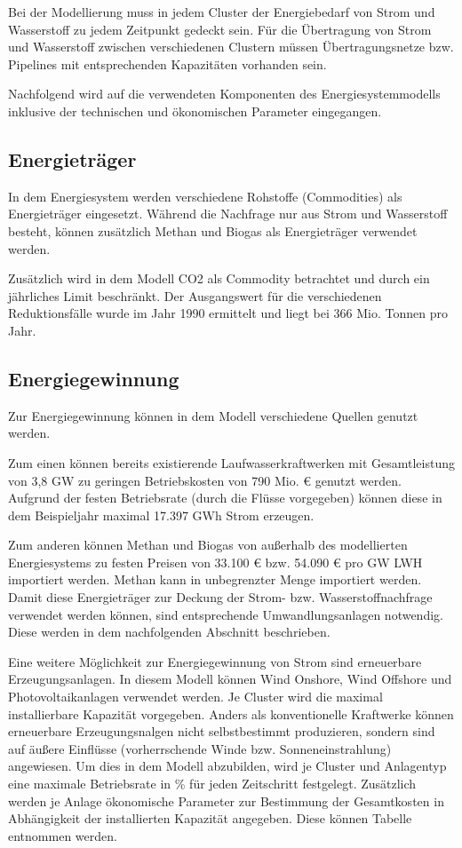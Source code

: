 Bei der Modellierung muss in jedem Cluster der Energiebedarf von Strom und Wasserstoff zu jedem Zeitpunkt gedeckt sein. Für die Übertragung von Strom und Wasserstoff zwischen verschiedenen Clustern müssen Übertragungsnetze bzw. Pipelines mit entsprechenden Kapazitäten vorhanden sein. 

Nachfolgend wird auf die verwendeten Komponenten des Energiesystemmodells inklusive der technischen und ökonomischen Parameter eingegangen. 
 
\subsection{Energieträger}
In dem Energiesystem werden verschiedene Rohstoffe (Commodities) als Energieträger eingesetzt. 
Während die Nachfrage nur aus Strom und Wasserstoff besteht, können zusätzlich Methan und Biogas als Energieträger verwendet werden.

Zusätzlich wird in dem Modell CO2 als Commodity betrachtet und durch ein jährliches Limit beschränkt. Der Ausgangswert für die verschiedenen Reduktionsfälle wurde im Jahr 1990 ermittelt und liegt bei 366 Mio. Tonnen pro Jahr. 

\subsection{Energiegewinnung}
Zur Energiegewinnung können in dem Modell verschiedene Quellen genutzt werden.

Zum einen können bereits existierende Laufwasserkraftwerken mit Gesamtleistung von 3,8 GW zu geringen Betriebskosten von 790 Mio. € genutzt werden. Aufgrund der festen Betriebsrate (durch die Flüsse vorgegeben) können diese in dem Beispieljahr maximal 17.397 GWh Strom erzeugen.

Zum anderen können Methan und Biogas von außerhalb des modellierten Energiesystems zu festen Preisen von 33.100 € bzw. 54.090 € pro GW LWH importiert werden. Methan kann in unbegrenzter Menge importiert werden.  
Damit diese Energieträger zur Deckung der Strom- bzw. Wasserstoffnachfrage verwendet werden können, sind entsprechende Umwandlungsanlagen notwendig. Diese werden in dem nachfolgenden Abschnitt beschrieben.

Eine weitere Möglichkeit zur Energiegewinnung von Strom sind erneuerbare Erzeugungsanlagen. In diesem Modell können Wind Onshore, Wind Offshore und Photovoltaikanlagen verwendet werden. Je Cluster wird die maximal installierbare Kapazität vorgegeben. 
Anders als konventionelle Kraftwerke können erneuerbare Erzeugungsnalgen nicht selbstbestimmt produzieren, sondern sind auf äußere Einflüsse (vorherrschende Winde bzw. Sonneneinstrahlung) angewiesen. Um dies in dem Modell abzubilden, wird je Cluster und Anlagentyp eine maximale Betriebsrate in \% für jeden Zeitschritt festgelegt. Zusätzlich werden je Anlage ökonomische Parameter zur Bestimmung der Gesamtkosten in Abhängigkeit der installierten Kapazität angegeben. Diese können Tabelle  entnommen werden.

